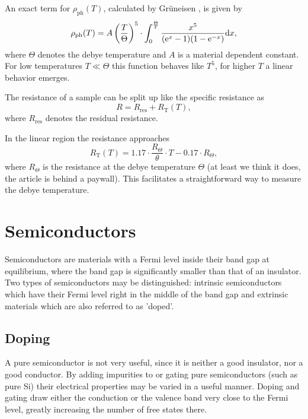 An exact term for $\rho_\text{ph}(T)$, calculated by Grüneisen \cite{elresistancemetal}, is given by
\begin{equation}
	\rho_\text{ph}(T) = A \left(\frac{T}{\Theta}\right)^5 \cdot \int_0^\frac{\Theta}{T}\frac{x^5}{(\mathrm{e}^x - 1)(1 - \mathrm{e}^{-x})} \text{d} x,
\end{equation}
where $\Theta$ denotes the debye temperature and $A$ is a material dependent constant.
For low temperatures $T \ll \Theta$ this function behaves like $T^5$, for higher $T$ a linear behavior emerges.

The resistance of a sample can be split up like the specific resistance as
\begin{equation*}
	R = R_\text{res} + R_\text{T}(T),
\end{equation*}
where $R_\text{res}$ denotes the residual resistance.

In the linear region the resistance approaches \cite{elresistancemetal}
\begin{equation}
	R_\text{T}(T) = \num{1.17} \cdot \frac{R_\Theta}{\theta} \cdot T - \num{0.17} \cdot R_\Theta,
\end{equation}
where $R_\Theta$ is the resistance at the debye temperature $\Theta$ (at least we think it does, the article is behind a paywall).
This facilitates a straightforward way to measure the debye temperature.

\section{Semiconductors}
Semiconductors are materials with a Fermi level inside their band gap at equilibrium, where the band gap is significantly smaller than that of an insulator.
Two types of semiconductors may be distinguished: intrinsic semiconductors which have their Fermi level right in the middle of the band gap and extrinsic materials which are also referred to as 'doped'.

\subsection{Doping}
A pure semiconductor is not very useful, since it is neither a good insulator, nor a good conductor.
By adding impurities to or gating pure semiconductors (such as pure Si) their electrical properties may be varied in a useful manner.
Doping and gating draw either the conduction or the valence band very close to the Fermi level, greatly increasing the number of free states there.

